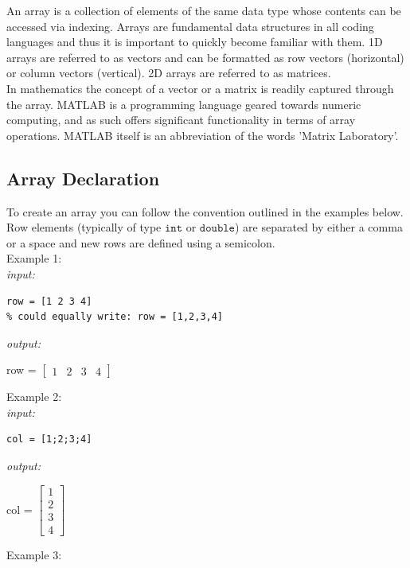\documentclass[../MATLAB_Primer.tex]{subfiles}
\begin{document}
An array is a collection of elements of the same data type whose contents can be accessed via indexing. Arrays are fundamental data structures in all coding languages and thus it is important to quickly become familiar with them.  1D arrays are referred to as vectors and can be formatted as row vectors (horizontal) or column vectors (vertical). 2D arrays are referred to as matrices.\\

In mathematics the concept of a vector or a matrix is readily captured through the array. MATLAB is a programming language geared towards numeric computing, and as such offers significant functionality in terms of array operations. MATLAB itself is an abbreviation of the words 'Matrix Laboratory'.

\subsection{Array Declaration}
To create an array you can follow the convention outlined in the examples below.  Row elements (typically of type $\texttt{int}$ or $\texttt{double}$) are separated by either a comma or a space and new rows are defined using a semicolon.\\

Example 1:\\

\textit{input:}
\begin{lstlisting}
row = [1 2 3 4]
% could equally write: row = [1,2,3,4]
\end{lstlisting}
\textit{output:}
\begin{center}
    row = 
$\begin{bmatrix}
 1 & 2 & 3 & 4
\end{bmatrix}$
\end{center}

Example 2:\\

\textit{input:}
\begin{lstlisting}
col = [1;2;3;4]
\end{lstlisting}
\textit{output:}
\begin{center}
col = 
$\begin{bmatrix}
 1\\
 2\\
 3\\
 4
\end{bmatrix}$
\end{center}

Example 3:\\
\end{document}
